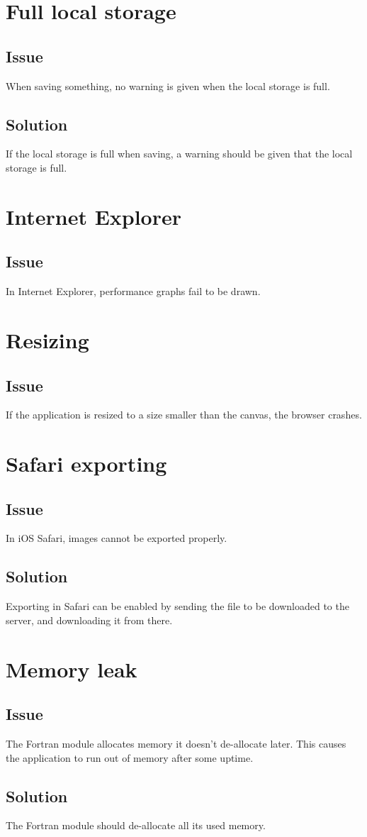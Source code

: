 \section*{Full local storage}

\subsection*{Issue}
When saving something, no warning is given when the local storage is full.

\subsection*{Solution}
If the local storage is full when saving, a warning should be given that the local storage is full.

\section*{Internet Explorer}

\subsection*{Issue}
In Internet Explorer, performance graphs fail to be drawn.

\section*{Resizing}

\subsection*{Issue}
If the application is resized to a size smaller than the canvas, the browser crashes.

\section*{Safari exporting}

\subsection*{Issue}
In iOS Safari, images cannot be exported properly.

\subsection*{Solution}
Exporting in Safari can be enabled by sending the file to be downloaded to the server, and downloading it from there.

\section*{Memory leak}

\subsection*{Issue}
The Fortran module allocates memory it doesn't de-allocate later. This causes the application to run out of memory after some uptime.

\subsection*{Solution}
The Fortran module should de-allocate all its used memory.

